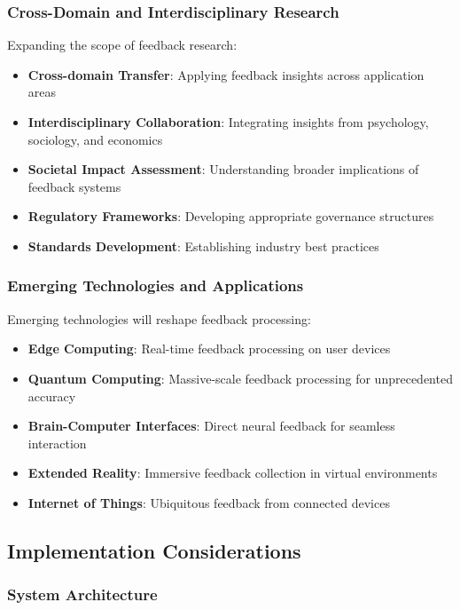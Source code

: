 \subsubsection{Cross-Domain and Interdisciplinary Research}

Expanding the scope of feedback research:

\begin{itemize}
    \item \textbf{Cross-domain Transfer}: Applying feedback insights across application areas
    \item \textbf{Interdisciplinary Collaboration}: Integrating insights from psychology, sociology, and economics
    \item \textbf{Societal Impact Assessment}: Understanding broader implications of feedback systems
    \item \textbf{Regulatory Frameworks}: Developing appropriate governance structures
    \item \textbf{Standards Development}: Establishing industry best practices
\end{itemize}

\subsubsection{Emerging Technologies and Applications}

Emerging technologies will reshape feedback processing:

\begin{itemize}
    \item \textbf{Edge Computing}: Real-time feedback processing on user devices
    \item \textbf{Quantum Computing}: Massive-scale feedback processing for unprecedented accuracy
    \item \textbf{Brain-Computer Interfaces}: Direct neural feedback for seamless interaction
    \item \textbf{Extended Reality}: Immersive feedback collection in virtual environments
    \item \textbf{Internet of Things}: Ubiquitous feedback from connected devices
\end{itemize}

\subsection{Implementation Considerations}

\subsubsection{System Architecture}

